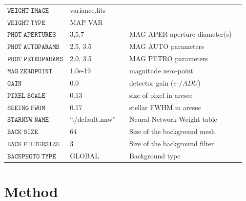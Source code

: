 \begin{table}
\begin{center}
\begin{tabular}{@{}lllll}
  $\mathtt{WEIGHT \; IMAGE}$ & variance.fits & &  \\
  $\mathtt{WEIGHT \; TYPE}$ & MAP VAR & &  \\
  $\mathtt{PHOT \; APERTURES}$ & 3,5,7 & &  MAG APER aperture diameter(s)\\
  $\mathtt{PHOT \; AUTOPARAMS}$ & 2.5, 3.5 & &  MAG AUTO parameters\\
  $\mathtt{PHOT \; PETROPARAMS}$ & 2.0, 3.5 & &  MAG PETRO parameters \\
  $\mathtt{MAG \; ZEROPOINT}$ & 1.0e-19  & &  magnitude zero-point \\
  $\mathtt{GAIN}$ & 0.0 & &  detector gain ($e$-$/ADU$) \\
  $\mathtt{PIXEL \; SCALE}$ & 0.13 & &  size of pixel in arcsec\\
  $\mathtt{SEEING \; FWHM}$ & 0.17 & &  stellar FWHM in arcsec \\
  $\mathtt{STARNNW \; NAME}$ & ``./default.nnw'' & &  Neural-Network Weight table\\
  $\mathtt{BACK \; SIZE}$ & 64 & &  Size of the background mesh\\
  $\mathtt{BACK \; FILTERSIZE}$ & 3 & &  Size of the background filter\\
  $\mathtt{BACKPHOTO \; TYPE}$ & GLOBAL & &  Background type\\
 \hline
  \end{tabular}
\end{center}
\end{table}

\clearpage

\section{Method}\label{sec:hstmethod}

